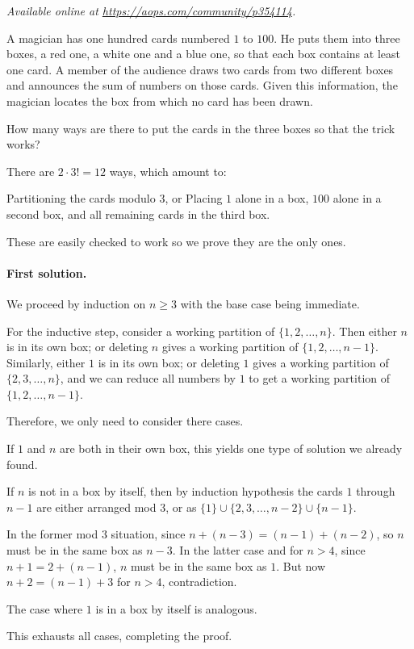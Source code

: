 \textsl{Available online at \url{https://aops.com/community/p354114}.}
\begin{mdframed}[style=mdpurplebox,frametitle={Problem statement}]
A magician has one hundred cards numbered $1$ to $100$.
He puts them into three boxes, a red one, a white one and a blue one,
so that each box contains at least one card.
A member of the audience draws two cards from two different boxes
and announces the sum of numbers on those cards.
Given this information,
the magician locates the box from which no card has been drawn.

How many ways are there to put the cards
in the three boxes so that the trick works?
\end{mdframed}
There are $2 \cdot 3! = 12$ ways, which amount to:
\begin{itemize}
  \ii Partitioning the cards modulo $3$, or
  \ii Placing $1$ alone in a box,
  $100$ alone in a second box,
  and all remaining cards in the third box.
\end{itemize}
These are easily checked to work so we prove they are the only ones.

\paragraph{First solution.}
We proceed by induction on $n \ge 3$ with the base case being immediate.

For the inductive step,
consider a working partition of $\{1, 2, \dots, n\}$.
Then either $n$ is in its own box; or
deleting $n$ gives a working partition of $\{1, 2, \dots, n-1\}$.
Similarly, either $1$ is in its own box; or
deleting $1$ gives a working partition of $\{2, 3, \dots, n\}$,
and we can reduce all numbers by $1$ to get
a working partition of $\{1, 2, \dots, n-1\}$.

Therefore, we only need to consider there cases.
\begin{itemize}
  \ii If $1$ and $n$ are both in their own box,
  this yields one type of solution we already found.

  \ii If $n$ is not in a box by itself,
  then by induction hypothesis the cards $1$ through $n-1$
  are either arranged mod $3$,
  or as $\{1\} \cup \{2,3,\dots,n-2\} \cup \{n-1\}$.
  \begin{itemize}
    \ii In the former mod $3$ situation,
    since $n + (n-3) = (n-1) + (n-2)$,
    so $n$ must be in the same box as $n-3$.
    \ii In the latter case and for $n > 4$,
    since $n + 1 = 2 + (n-1)$,
    $n$ must be in the same box as $1$.
    But now $n + 2 = (n-1) + 3$ for $n > 4$, contradiction.
  \end{itemize}

  \ii The case where $1$ is in a box by itself is analogous.
\end{itemize}
This exhausts all cases, completing the proof.

